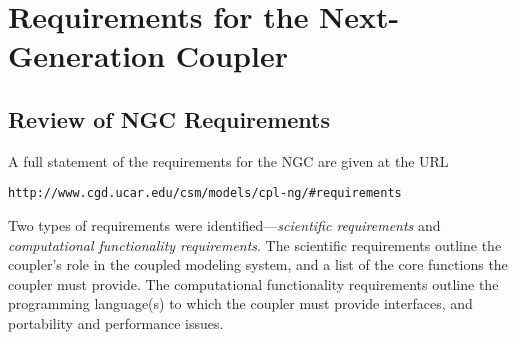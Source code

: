 \documentclass{article}
\begin{document}
\section{Requirements for the Next-Generation Coupler}\label{sec-req}

\subsection{Review of NGC Requirements}

A full statement of the requirements for the NGC are given at the
URL
\begin{verbatim}
http://www.cgd.ucar.edu/csm/models/cpl-ng/#requirements
\end{verbatim}

Two types of requirements were identified---{\em scientific
requirements} and {\em computational functionality requirements}.
The scientific requirements outline the coupler's role in the
coupled modeling system, and a list of the core functions the
coupler must provide.  The computational functionality
requirements outline the programming language(s) to which the
coupler must provide interfaces, and portability and performance
issues.
\end{document}
